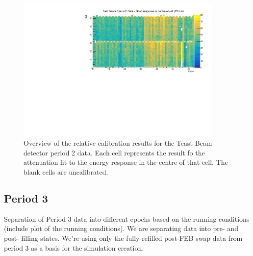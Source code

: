 \documentclass[12pt,a4paper]{article}
\begin{document}
\begin{figure}[!hbtp]
\centering
\includegraphics[width=0.9\textwidth]{Plots/CellResponseAtCentre_period2_Limited.pdf}
\caption{Overview of the relative calibration results for the Teast Beam detector period 2 data. Each cell represents the result fo the attenuation fit to the energy response in the centre of that cell. The blank cells are uncalibrated.}
\end{figure}

\subsection{Period 3}
Separation of Period 3 data into different epochs based on the running conditions (include plot of the running conditions). We are separating data into pre- and post- filling states. We're using only the fully-refilled post-FEB swap data from period 3 as a basis for the simulation creation.
\end{document}

